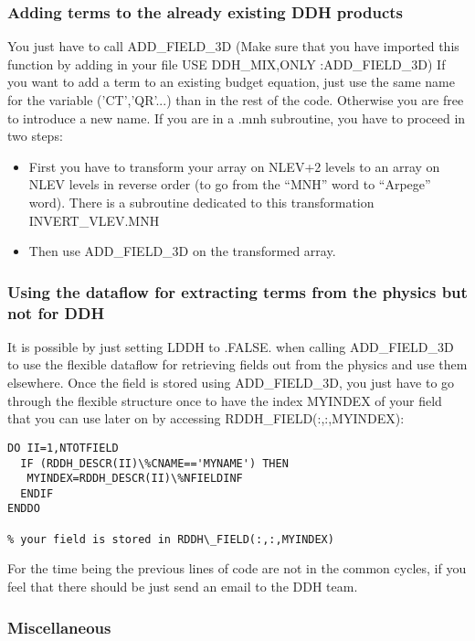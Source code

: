 \subsubsection{Adding terms to the already existing DDH products}

You just have to call ADD\_FIELD\_3D (Make sure that you have imported this function by adding in your file USE DDH\_MIX,ONLY :ADD\_FIELD\_3D)
If you want to add a term to an existing budget equation, just use the same name for the variable ('CT','QR'...) than in the rest of the code.
Otherwise you are free to introduce a new name.
If you are in a .mnh subroutine, you have to proceed in two steps:
\begin{itemize}
 \item First you have to transform your array on NLEV+2 levels to an array on NLEV levels in reverse order (to go from the ``MNH'' word to ``Arpege'' word).
There is a subroutine dedicated to this transformation INVERT\_VLEV.MNH 
\item  Then use ADD\_FIELD\_3D on the transformed array.
\end{itemize}





\subsubsection{Using the dataflow for extracting terms from the physics but not for DDH}

It is possible by just setting LDDH to .FALSE. when calling ADD\_FIELD\_3D to use
the flexible dataflow for retrieving fields out from the physics and use them elsewhere.
Once the field is stored using ADD\_FIELD\_3D, you just have to go through the flexible structure once
to have the index MYINDEX of your field that you can use later on by accessing RDDH\_FIELD(:,:,MYINDEX): 

\begin{verbatim}
DO II=1,NTOTFIELD
  IF (RDDH_DESCR(II)\%CNAME=='MYNAME') THEN
   MYINDEX=RDDH_DESCR(II)\%NFIELDINF
  ENDIF
ENDDO

% your field is stored in RDDH\_FIELD(:,:,MYINDEX)
\end{verbatim}

For the time being the previous lines of code are not in the common cycles, if you feel that there should be 
just send an email to the DDH team.

\subsubsection{Miscellaneous}

